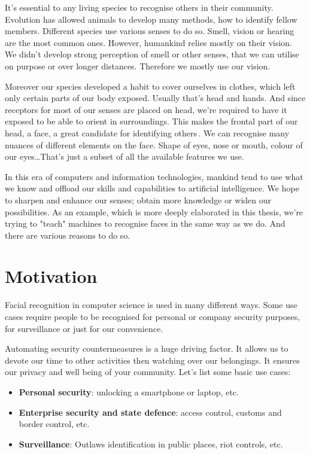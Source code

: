 It's essential to any living species to recognise others in their community. Evolution has allowed animals to develop many methods, how to identify fellow members. Different species use various senses to do so. Smell, vision or hearing are the most common ones. However, humankind relies mostly on their vision. We didn't develop strong perception of smell or other senses, that we can utilise on purpose or over longer distances. Therefore we mostly use our vision.

Moreover our species developed a habit to cover ourselves in clothes, which left only certain parts of our body exposed. Usually that's head and hands. And since receptors for most of our senses are placed on head, we're required to have it exposed to be able to orient in surroundings. This makes the frontal part of our head, a face, a great candidate for identifying others\,\cite{biometrie1}. We can recognise many nuances of different elements on the face. Shape of eyes, nose or mouth, colour of our eyes\dots That's just a subset of all the available features we use.

In this era of computers and information technologies, mankind tend to use what we know and offload our skills and capabilities to artificial intelligence. We hope to sharpen and enhance our senses; obtain more knowledge or widen our possibilities. As an example, which is more deeply elaborated in this thesis, we're trying to "teach" machines to recognise faces in the same way as we do. And there are various reasons to do so.

\section{Motivation}
Facial recognition in computer science is used in many different ways. Some use cases require people to be recognised for personal or company security purposes, for surveillance or just for our convenience.

Automating security countermeasures is a huge driving factor. It allows us to devote our time to other activities then watching over our belongings. It ensures our privacy and well being of your community. Let's list some basic use cases:

\begin{itemize}
    \item \textbf{Personal security}: unlocking a smartphone or laptop, etc.
    \item \textbf{Enterprise security and state defence}: access control, customs and border control, etc.
    \item \textbf{Surveillance}: Outlaws identification in public places, riot controls, etc.
\end{itemize}

